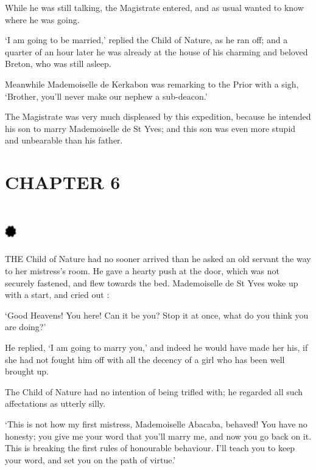 \documentclass{article}
\begin{document}
\begin{center}
While he was still talking, the Magistrate entered, and as usual wanted to know 
where he was going. 

`I am going to be married,' replied the Child of Nature, as he ran off; and a quarter 
of an hour later he was already at the house of his charming and beloved Breton, 
who was still asleep. 

Meanwhile Mademoiselle de Kerkabon was remarking to the Prior with a sigh, `Brother, 
you'll never make our nephew a sub-deacon.' 

The Magistrate was very much displeased by this expedition, because he intended 
his son to marry Mademoiselle de St Yves; and this son was even more stupid and 
unbearable than his father.\pagebreak{} 

\section*{\textbf{CHAPTER 6  }}

\section*{%
\includegraphics[width=14pt, height=15pt, keepaspectratio=true]{Zadig or L'Ingenu - Voltaire-fig028.jpg}
}

 

THE Child of Nature had no sooner arrived than he asked an old servant the way 
to her mistress's room. He gave a hearty push at the door, which was not securely 
fastened, and flew towards the bed. Mademoiselle de St Yves woke up with a start, 
and cried out : 

`Good Heavens! You here! Can it be you? Stop it at once, what do you think you 
are doing?' 

He replied, `I am going to marry you,' and indeed he would have made her his, if 
she had not fought him off with all the decency of a girl who has been well brought 
up. 

The Child of Nature had no intention of being trifled with; he regarded all such 
affectations as utterly silly. 

`This is not how my first mistress, Mademoiselle Abacaba, behaved! You have no 
honesty; you give me your word that you'll marry me, and now you go back on it. 
This is breaking the first rules of honourable behaviour. I'll teach you to keep 
your word, and set you on the path of virtue.' 


\end{center}
\end{document}
